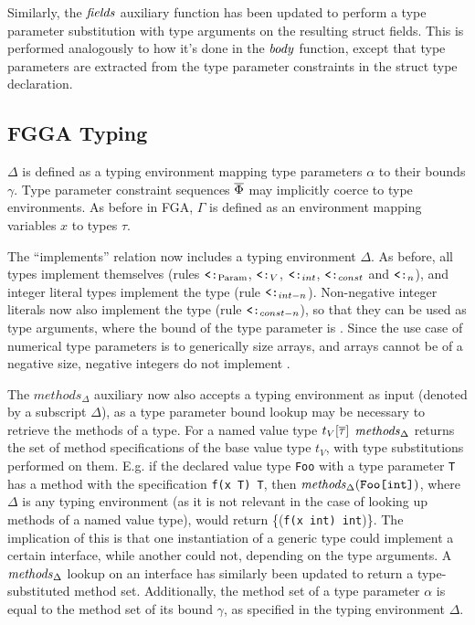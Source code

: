 Similarly, the $\mathit{fields}$ auxiliary function has been updated to perform a type
parameter substitution with type arguments on the resulting struct fields. This
is performed analogously to how it's done in the $\mathit{body}$ function, except that
type parameters are extracted from the type parameter constraints in the struct
type declaration.



\subsection{FGGA Typing}

$\Delta$ is defined as a typing environment mapping type parameters $\alpha$
to their bounds $\gamma$. Type parameter constraint sequences $\overline{\Phi}$ may
implicitly coerce to type environments. As before in FGA, $\Gamma$ is defined as
an environment mapping variables $x$ to types $\tau$.

The ``implements'' relation now includes a typing environment $\Delta$. As
before, all types implement themselves (rules $\mathbin{\texttt{<:}}_{\text{Param}}$, $\mathbin{\texttt{<:}}_V$,
$\mathbin{\texttt{<:}}_{int}$, $\mathbin{\texttt{<:}}_{const}$ and $\mathbin{\texttt{<:}}_n$), and integer literal types implement
the  type (rule $\mathbin{\texttt{<:}}_{int-n}$). Non-negative integer literals now also
implement the  type (rule $\mathbin{\texttt{<:}}_{const-n}$), so that they can be used
as type arguments, where the bound of the type parameter is . Since
the use case of numerical type parameters is to generically size arrays, and
arrays cannot be of a negative size, negative integers do not implement
.


The $methods_\Delta$ auxiliary now also accepts a typing environment as input
(denoted by a subscript $\Delta$), as a type parameter bound lookup may be
necessary to retrieve the methods of a type. For a named value type
$t_V[\overline{\tau}]$ $\mathit{methods}_\Delta$ returns the set of method specifications of
the base value type $t_V$, with type substitutions performed on them. E.g. if
the declared value type \texttt{Foo} with a type parameter \texttt{T} has a
method with the specification \texttt{f(x T) T}, then
$\mathit{methods}_\Delta(\texttt{Foo[int]})$, where $\Delta$ is any typing environment
(as it is not relevant in the case of looking up methods of a named value type),
would return \{(\texttt{f(x int) int})\}. The implication of this is that one
instantiation of a generic type could implement a certain interface, while
another could not, depending on the type arguments. A $\mathit{methods}_\Delta$ lookup
on an interface has similarly been updated to return a type-substituted method
set. Additionally, the method set of a type parameter $\alpha$ is equal to the
method set of its bound $\gamma$, as specified in the typing environment
$\Delta$.

